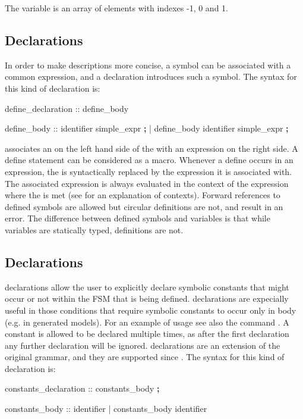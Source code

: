 \noindent The variable  is an array of \Boolean elements with
indexes -1, 0 and 1.


\subsection{ Declarations}
\label{DEFINE Declarations}
%
In order to make descriptions more concise, a symbol can be associated
with a common expression, and a  declaration
introduces such a symbol.
%
The syntax for this kind of declaration is:
%
\begin{Grammar}
define_declaration ::  define_body

define_body :: identifier \operator{:=} simple_expr \textbf{;}
             | define_body identifier \operator{:=} simple_expr \textbf{;}
\end{Grammar}
%
 associates an  on the left hand
side of the  with an expression on the right side.
%
A define statement can be considered as a macro. 
%
Whenever a define  occurs in an expression, the
 is syntactically replaced by the expression it is
associated with.
%
The associated expression is always evaluated in the context of the
expression where the  is met (see 
for an explanation of contexts).
%
Forward references to defined symbols are allowed but circular
definitions are not, and result in an error.
%
The difference between defined symbols and variables is that while
variables are statically typed, definitions are not.


\subsection{ Declarations}
\label{CONSTANTS Declarations}
%
 declarations allow the user to explicitly 
declare symbolic constants that might occur or not within the FSM that
is being defined. 
%
 declarations are expecially useful 
in those conditions that require symbolic constants to occur only
in  body (e.g. in generated models).
For an example of usage see also the command .
%
A constant is allowed to be declared multiple times, as after the
first declaration any further declaration will be ignored.
%
 declarations are an extension of the original 
\smv grammar, and they are supported since \NuSMV.
%
The syntax for this kind of declaration is:
%
\begin{Grammar}
constants_declaration ::  constants_body \textbf{;}

constants_body :: identifier 
             | constants_body  \operator{,} identifier
\end{Grammar}


